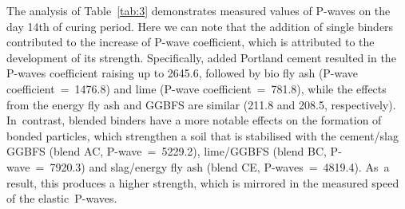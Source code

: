 \documentclass[materials,article,accept,pdftex,moreauthors]{Definitions/mdpi}
\begin{document}
The analysis of Table~\ref{tab:3} demonstrates measured values of P-waves on the day 14th of curing period. Here we can note that the addition of single binders contributed to the increase of P-wave coefficient, which is attributed to the development of its strength. Specifically, added Portland cement resulted in the P-waves coefficient raising up to 2645.6, followed by bio fly ash (P-wave coefficient~=~1476.8) and lime (P-wave coefficient~=~781.8), while the effects from the energy fly ash and GGBFS are similar (211.8 and 208.5, respectively). In~contrast, blended binders have a more notable effects on the formation of bonded particles, which strengthen a soil that is stabilised with the cement/slag GGBFS (blend AC, P-wave~=~5229.2), lime/GGBFS (blend BC, P-wave~=~7920.3) and slag/energy fly ash (blend CE, P-waves~=~4819.4). As~a result, this produces a higher strength, which is mirrored in the measured speed of the elastic~P-waves. 
 
\end{document}
